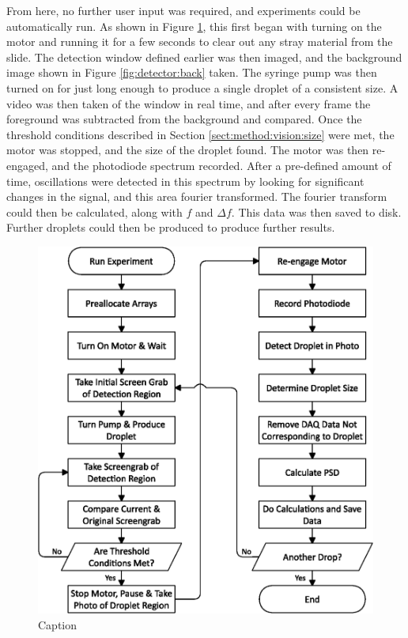 \documentclass{physics_article_B}
\begin{document}
        From here, no further user input was required, and experiments could be automatically run. As shown in Figure \ref{fig:setup:logic}, this first began with turning on the motor and running it for a few seconds to clear out any stray material from the slide. The detection window defined earlier was then imaged, and the background image shown in Figure \ref{fig:detector:back} taken. The syringe pump was then turned on for just long enough to produce a single droplet of a consistent size. A video was then taken of the window in real time, and after every frame the foreground was subtracted from the background and compared. Once the threshold conditions described in Section \ref{sect:method:vision:size} were met, the motor was stopped, and the size of the droplet found. The motor was then re-engaged, and the photodiode spectrum recorded. After a pre-defined amount of time, oscillations were detected in this spectrum by looking for significant changes in the signal, and this area fourier transformed. The fourier transform could then be calculated, along with $f$ and $\Delta f$. This data was then saved to disk. Further droplets could then be produced to produce further results.
    
        \begin{figure}[H]
            \centering
            \hspace*{-1cm}\includegraphics[scale=0.8]{Figures/FlowLogic.eps}
            \caption{Caption}
            \label{fig:setup:logic}
        \end{figure}
\end{document}
